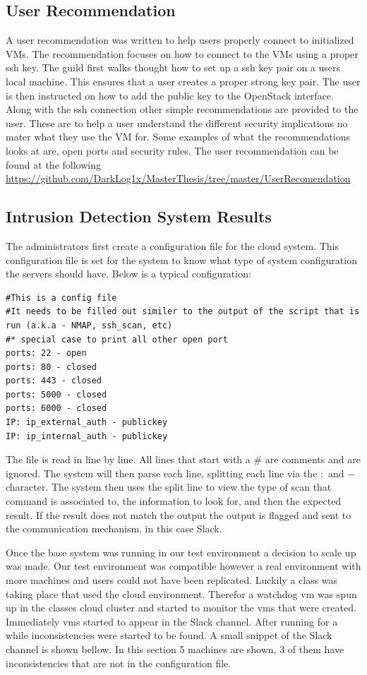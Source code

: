 \documentclass[12pt]{article}
\begin{document}
\subsection{User Recommendation}
A user recommendation was written to help users properly connect to initialized VMs. The recommendation focuses on how to connect to the VMs using a proper ssh key. The guild first walks thought how to set up a ssh key pair on a users local machine. This ensures that a user creates a proper strong key pair. The user is then instructed on how to add the public key to the OpenStack interface. Along with the ssh connection other simple recommendations are provided to the user. These are to help a user understand the different security implications no mater what they use the VM for. Some examples of what the recommendations looks at are, open ports and security rules. The user recommendation can be found at the following \href{link}{https://github.com/DarkLog1x/MasterThesis/tree/master/UserRecomendation}

\subsection{Intrusion Detection System Results}
The administrators first create a configuration file for the cloud system. This configuration file is set for the system to know what type of system configuration the servers should have. Below is a typical configuration:

\begin{mdframed}
    \begin{lstlisting}
#This is a config file
#It needs to be filled out similer to the output of the script that is run (a.k.a - NMAP, ssh_scan, etc)
#* special case to print all other open port 
ports: 22 - open
ports: 80 - closed
ports: 443 - closed
ports: 5000 - closed
ports: 6000 - closed
IP: ip_external_auth - publickey
IP: ip_internal_auth - publickey
    \end{lstlisting}
\end{mdframed}
The file is read in line by line. All lines that start with a \# are comments and are ignored. The system will then parse each line, splitting each line via the $:$ and $-$ character. The system then uses the split line to view the type of scan that command is associated to, the information to look for, and then the expected result. If the result does not match the output the output is flagged and sent to the communication mechanism, in this case Slack.

Once the base system was running in our test environment a decision to scale up was made. Our test environment was compatible however a real environment with more machines and users could not have been replicated. Luckily a class was taking place that used the cloud environment. Therefor a watchdog vm was spun up in the classes cloud cluster and started to monitor the vms that were created. Immediately vms started to appear in the Slack channel. After running for a while inconsistencies were started to be found. A small snippet of the Slack channel is shown bellow. In this section 5 machines are shown, 3 of them have inconsistencies that are not in the configuration file.
\end{document}
